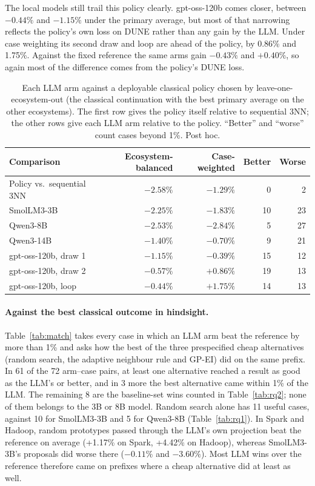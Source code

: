 The local models still trail this policy clearly. gpt-oss-120b comes closer, between $-0.44\%$ and $-1.15\%$ under the primary average, but most of that narrowing reflects the policy's own loss on DUNE rather than any gain by the LLM. Under case weighting its second draw and loop are ahead of the policy, by 0.86\% and 1.75\%. Against the fixed reference the same arms gain $-0.43\%$ and $+0.40\%$, so again most of the difference comes from the policy's DUNE loss.

\begin{table}[t]
\centering
\caption{Each LLM arm against a deployable classical policy chosen by leave-one-ecosystem-out (the classical continuation with the best primary average on the other ecosystems). The first row gives the policy itself relative to sequential 3NN; the other rows give each LLM arm relative to the policy. ``Better'' and ``worse'' count cases beyond 1\%. Post hoc.}
\label{tab:deployable}
\small
\begin{tabular}{lrrrr}
\toprule
Comparison & Ecosystem-balanced & Case-weighted & Better & Worse \\
\midrule
Policy vs.\ sequential 3NN & $-2.58\%$ & $-1.29\%$ & 0 & 2 \\
\midrule
SmolLM3-3B & $-2.25\%$ & $-1.83\%$ & 10 & 23 \\
Qwen3-8B & $-2.53\%$ & $-2.84\%$ & 5 & 27 \\
Qwen3-14B & $-1.40\%$ & $-0.70\%$ & 9 & 21 \\
gpt-oss-120b, draw 1 & $-1.15\%$ & $-0.39\%$ & 15 & 12 \\
gpt-oss-120b, draw 2 & $-0.57\%$ & $+0.86\%$ & 19 & 13 \\
gpt-oss-120b, loop & $-0.44\%$ & $+1.75\%$ & 14 & 13 \\
\bottomrule
\end{tabular}
\end{table}

\paragraph{Against the best classical outcome in hindsight.} Table~\ref{tab:match} takes every case in which an LLM arm beat the reference by more than 1\% and asks how the best of the three prespecified cheap alternatives (random search, the adaptive neighbour rule and GP-EI) did on the same prefix. In 61 of the 72 arm--case pairs, at least one alternative reached a result as good as the LLM's or better, and in 3 more the best alternative came within 1\% of the LLM. The remaining 8 are the baseline-set wins counted in Table~\ref{tab:rq2}; none of them belongs to the 3B or 8B model. Random search alone has 11 useful cases, against 10 for SmolLM3-3B and 5 for Qwen3-8B (Table~\ref{tab:rq1}). In Spark and Hadoop, random prototypes passed through the LLM's own projection beat the reference on average (+1.17\% on Spark, +4.42\% on Hadoop), whereas SmolLM3-3B's proposals did worse there ($-0.11\%$ and $-3.60\%$). Most LLM wins over the reference therefore came on prefixes where a cheap alternative did at least as well.

